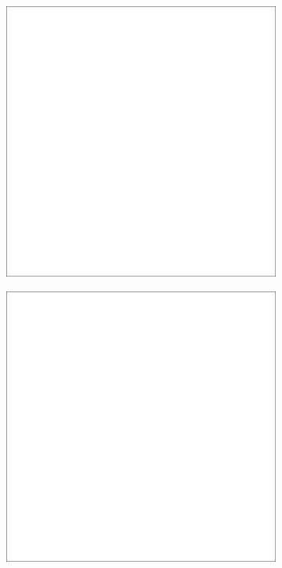 \begin{figure}[H]
    \begin{subfigure}[t]{0.32\textwidth}
        \includegraphics[width=\linewidth]{chapter04/img/max-0001.png}
    \end{subfigure}
    \begin{subfigure}[t]{0.32\textwidth}
        \includegraphics[width=\linewidth]{chapter04/img/max-0030.png}

\end{subfigure}
\end{figure}
